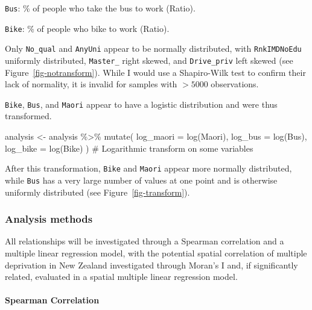 \documentclass[
  letterpaper,
  DIV=11,
  numbers=noendperiod,
  oneside]{scrartcl}
\let\oldparagraph\paragraph
\renewcommand{\paragraph}[1]{\oldparagraph{#1}\mbox{}}
\newenvironment{Shaded}{\begin{snugshade}}{\end{snugshade}}
\newcommand{\AttributeTok}[1]{\textcolor[rgb]{0.40,0.45,0.13}{#1}}
\newcommand{\CommentTok}[1]{\textcolor[rgb]{0.37,0.37,0.37}{#1}}
\newcommand{\FunctionTok}[1]{\textcolor[rgb]{0.28,0.35,0.67}{#1}}
\newcommand{\NormalTok}[1]{\textcolor[rgb]{0.00,0.23,0.31}{#1}}
\newcommand{\OtherTok}[1]{\textcolor[rgb]{0.00,0.23,0.31}{#1}}
\newcommand{\SpecialCharTok}[1]{\textcolor[rgb]{0.37,0.37,0.37}{#1}}
\begin{document}
\texttt{Bus}: \% of people who take the bus to work (Ratio).

\texttt{Bike}: \% of people who bike to work (Ratio).

Only \texttt{No\_qual} and \texttt{AnyUni} appear to be normally
distributed, with \texttt{RnkIMDNoEdu} uniformly distributed,
\texttt{Master\_} right skewed, and \texttt{Drive\_priv} left skewed
(see Figure~\ref{fig-notransform}). While I would use a Shapiro-Wilk
test to confirm their lack of normality, it is invalid for samples with
\(> 5000\) observations.

\texttt{Bike}, \texttt{Bus}, and \texttt{Maori} appear to have a
logistic distribution and were thus transformed.

\begin{Shaded}
\begin{Highlighting}[]
\NormalTok{analysis }\OtherTok{\textless{}{-}}\NormalTok{ analysis }\SpecialCharTok{\%\textgreater{}\%}
  \FunctionTok{mutate}\NormalTok{(}
    \AttributeTok{log\_maori =} \FunctionTok{log}\NormalTok{(Maori),}
    \AttributeTok{log\_bus =} \FunctionTok{log}\NormalTok{(Bus),}
    \AttributeTok{log\_bike =} \FunctionTok{log}\NormalTok{(Bike)}
\NormalTok{  )}
  \CommentTok{\# Logarithmic transform on some variables}
\end{Highlighting}
\end{Shaded}

After this transformation, \texttt{Bike} and \texttt{Maori} appear more
normally distributed, while \texttt{Bus} has a very large number of
values at one point and is otherwise uniformly distributed (see
Figure~\ref{fig-transform}).

\hypertarget{analysis-methods}{%
\subsubsection{Analysis methods}\label{analysis-methods}}

All relationships will be investigated through a Spearman correlation
and a multiple linear regression model, with the potential spatial
correlation of multiple deprivation in New Zealand investigated through
Moran's I and, if significantly related, evaluated in a spatial multiple
linear regression model.

\hypertarget{spearman-correlation}{%
\paragraph{Spearman Correlation}\label{spearman-correlation}}
\end{document}

